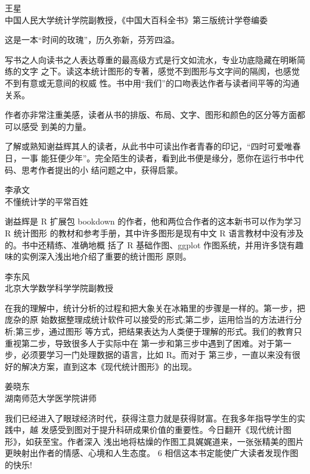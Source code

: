 \documentclass[
  b5paper,
  UTF8,twoside]{book}
\begin{document}
\begin{flushright}
王星\\
中国人民大学统计学院副教授，《中国大百科全书》第三版统计学卷编委
\end{flushright}

这是一本``时间的玫瑰''，历久弥新，芬芳四溢。

写书之人向读书之人表达尊重的最高级方式是行文如流水，专业功底隐藏在明晰简练的文字 之下。读这本统计图形的专著，感觉不到图形与文字间的隔阂，也感觉不到有意或无意间的权威 性。书中用``我们''的口吻表达作者与读者间平等的沟通关系。

作者亦非常注重美感，读者从书的排版、布局、文字、图形和颜色的区分等方面都可以感受 到美的力量。

了解或熟知谢益辉其人的读者，从此书中可读出作者青春的印记，``四时可爱唯春日，一事 能狂便少年''。完全陌生的读者，看到此书便是缘分，愿你在运行书中代码、思考作者提出的小 结问题之中，获得启蒙。

\begin{flushright}
李承文\\
不懂统计学的平常百姓
\end{flushright}

谢益辉是 R 扩展包 bookdown 的作者，他和两位合作者的这本新书可以作为学习 R 统计图形 的教材和参考手册，其中许多图形是现有中文 R 语言教材中没有涉及的。书中还精练、准确地概 括了 R 基础作图、ggplot 作图系统，并用许多饶有趣味的实例深入浅出地介绍了重要的统计图形 原则。

\begin{flushright}
李东风\\
北京大学数学科学学院副教授
\end{flushright}

在我的理解中，统计分析的过程和把大象关在冰箱里的步骤是一样的。第一步，把庞杂的原 始数据整理成统计软件可以接受的形式;第二步，运用恰当的方法进行分析;第三步，通过图形 等方式，把结果表达为人类便于理解的形式。我们的教育只重视第二步，导致很多人于实际中在 第一步和第三步中遇到了困难。对于第一步，必须要学习一门处理数据的语言，比如 R。而对于 第三步，一直以来没有很好的解决方案，直到这本《现代统计图形》的出现。

\begin{flushright}
姜晓东\\
湖南师范大学医学院讲师
\end{flushright}

我们已经进入了眼球经济时代，获得注意力就是获得财富。在我多年指导学生的实践中，越 发感受到图对于提升科研成果价值的重要性。今日翻开《现代统计图形》，如获至宝。作者深入 浅出地将枯燥的作图工具娓娓道来，一张张精美的图片更映射出作者的情感、心境和人生态度。 6 相信这本书定能使广大读者发现作图的快乐!
\end{document}

